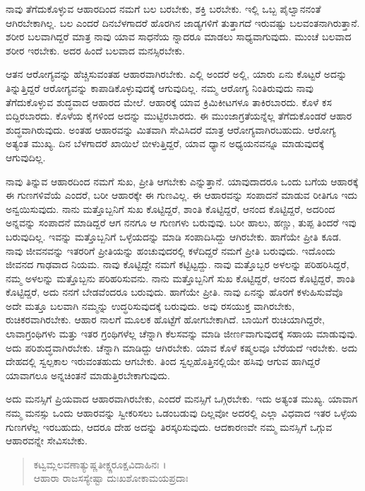 ನಾವು ತೆಗೆದುಕೊಳ್ಳುವ ಆಹಾರದಿಂದ ನಮಗೆ ಬಲ ಬರಬೇಕು, ಶಕ್ತಿ ಬರಬೇಕು. ಇಲ್ಲಿ ಒಬ್ಬ ಪೈಲ್ವಾನನಂತೆ ಆಗಿರಬೇಕಾಗಿಲ್ಲ. ಬಲ ಎಂದರೆ ದಿನಬೆಳಗಾದರೆ ಹೊರಗಿನ ಜಾಡ್ಯಗಳಿಗೆ ತುತ್ತಾಗದೆ ಇರುವಷ್ಟು ಬಲವಂತನಾಗಿರುತ್ತಾನೆ. ಶರೀರ ಬಲವಾಗಿದ್ದರೆ ಮಾತ್ರ ನಾವು ಯಾವ ಸಾಧನೆಯ ನ್ನಾದರೂ ಮಾಡಲು ಸಾಧ್ಯವಾಗುವುದು. ಮುಂಚೆ ಬಲವಾದ ಶರೀರ ಇರಬೇಕು. ಅದರ ಹಿಂದೆ ಬಲವಾದ ಮನಸ್ಸಿರಬೇಕು.

ಆತನ ಆರೋಗ್ಯವನ್ನು ಹೆಚ್ಚಿಸುವಂತಹ ಆಹಾರವಾಗಿರಬೇಕು. ಎಲ್ಲಿ ಅಂದರೆ ಅಲ್ಲಿ, ಯಾರು ಏನು ಕೊಟ್ಟರೆ ಅದನ್ನು ತಿನ್ನುತ್ತಿದ್ದರೆ ಆರೋಗ್ಯವನ್ನು ಕಾಪಾಡಿಕೊಳ್ಳುವುದಕ್ಕೆ ಆಗುವುದಿಲ್ಲ. ನಮ್ಮ ಆರೋಗ್ಯ ನಿಂತಿರುವುದು ನಾವು ತೆಗೆದುಕೊಳ್ಳುವ ಶುದ್ಧವಾದ ಆಹಾರದ ಮೇಲೆ. ಆಹಾರಕ್ಕೆ ಯಾವ ಕ್ರಿಮಿಕೀಟಗಳೂ ತಾಕಿರಬಾರದು. ಕೊಳೆ ಕಸ ಬಿದ್ದಿರಬಾರದು. ಕೊಳೆಯ ಕೈಗಳಿಂದ ಅದನ್ನು ಮುಟ್ಟಿರಬಾರದು. ಈ ಮುಂಜಾಗ್ರತೆಯನ್ನೆಲ್ಲ ತೆಗೆದುಕೊಂಡರೆ ಆಹಾರ ಶುದ್ಧವಾಗಿರುವುದು. ಅಂತಹ ಆಹಾರವನ್ನು ಮಿತವಾಗಿ ಸೇವಿಸಿದರೆ ಮಾತ್ರ ಆರೋಗ್ಯವಾಗಿರಬಹುದು. ಆರೋಗ್ಯ ಅತ್ಯಂತ ಮುಖ್ಯ. ದಿನ ಬೆಳಗಾದರೆ ಖಾಯಿಲೆ ಬೀಳುತ್ತಿದ್ದರೆ, ಯಾವ ಧ್ಯಾನ ಅಧ್ಯಯನವನ್ನೂ ಮಾಡುವುದಕ್ಕೆ ಆಗುವುದಿಲ್ಲ.

ನಾವು ತಿನ್ನುವ ಆಹಾರದಿಂದ ನಮಗೆ ಸುಖ, ಪ್ರೀತಿ ಆಗಬೇಕು ಎನ್ನುತ್ತಾನೆ. ಯಾವುದಾದರೂ ಒಂದು ಬಗೆಯ ಆಹಾರಕ್ಕೆ ಈ ಗುಣಗಳಿವೆಯೆ ಎಂದರೆ, ಬರೀ ಆಹಾರಕ್ಕೇ ಈ ಗುಣವಿಲ್ಲ. ಈ ಆಹಾರವನ್ನು ಸಂಪಾದನೆ ಮಾಡುವ ರೀತಿಗೂ ಇದು ಅನ್ವಯಿಸುವುದು. ನಾನು ಮತ್ತೊಬ್ಬನಿಗೆ ಸುಖ ಕೊಟ್ಟಿದ್ದರೆ, ಶಾಂತಿ ಕೊಟ್ಟಿದ್ದರೆ, ಆನಂದ ಕೊಟ್ಟಿದ್ದರೆ, ಅದರಿಂದ ಅನ್ನವನ್ನು ಸಂಪಾದನೆ ಮಾಡಿದ್ದರೆ ಆಗ ನನಗೂ ಆ ಗುಣಗಳು ಬರುವುವು. ಬರೀ ಹಾಲು, ಹಣ್ಣು, ತುಪ್ಪ ತಿಂದರೆ ಇವು ಬರುವುದಿಲ್ಲ. ಇವನ್ನು ಮತ್ತೊಬ್ಬನಿಗೆ ಒಳ್ಳೆಯದನ್ನು ಮಾಡಿ ಸಂಪಾದಿಸಿದ್ದು ಆಗಿರಬೇಕು. ಹಾಗೆಯೇ ಪ್ರೀತಿ ಕೂಡ. ನಾವು ಜೀವನವನ್ನು ಇತರರಿಗೆ ಪ್ರೀತಿಯನ್ನು ಹಂಚುವುದರಲ್ಲಿ ಕಳೆದಿದ್ದರೆ ನಮಗೆ ಪ್ರೀತಿ ಬರುವುದು. ಇದೊಂದು ಜೀವನದ ಗಾಢವಾದ ನಿಯಮ. ನಾವು ಕೊಟ್ಟಿದ್ದೇ ನಮಗೆ ಕಟ್ಟಿಟ್ಟದ್ದು. ನಾವು ಮತ್ತೊಬ್ಬರ ಅಳಲನ್ನು ಪರಿಹರಿಸಿದ್ದರೆ, ನಮ್ಮ ಅಳಲನ್ನು ಮತ್ತೊಬ್ಬನು ಪರಿಹರಿಸುವನು. ನಾನು ಮತ್ತೊಬ್ಬನಿಗೆ ಸುಖ ಕೊಟ್ಟಿದ್ದರೆ, ಆನಂದ ಕೊಟ್ಟಿದ್ದರೆ, ಶಾಂತಿ ಕೊಟ್ಟಿದ್ದರೆ, ಅದು ನನಗೆ ಬೇಡವೆಂದರೂ ಬರುವುದು. ಹಾಗೆಯೇ ಪ್ರೀತಿ. ನಾವು ಏನನ್ನು ಹೊರಗೆ ಕಳುಹಿಸುವೆವೊ ಅದೇ ಮತ್ತೂ ಬಲವಾಗಿ ನಮ್ಮನ್ನು ಉದ್ಧರಿಸುವುದಕ್ಕೆ ಬರುವುದು. ಅವು ರಸಯುಕ್ತ ವಾಗಿರಬೇಕು, ರುಚಿಕರವಾಗಿರಬೇಕು. ಆಹಾರ ನಾಲಗೆ ಮೂಲಕ ಹೊಟ್ಟೆಗೆ ಹೋಗಬೇಕಾಗಿದೆ. ಬಾಯಿಗೆ ರುಚಿಯಾಗಿದ್ದರೇ, ಲಾವಾಗ್ರಂಥಿಗಳು ಮತ್ತು ಇತರ ಗ್ರಂಥಿಗಳೆಲ್ಲ ಚೆನ್ನಾಗಿ ಕೆಲಸವನ್ನು ಮಾಡಿ ಜೀರ್ಣವಾಗುವುದಕ್ಕೆ ಸಹಾಯ ಮಾಡುವುವು. ಅದು ಪರಿಶುದ್ಧವಾಗಿರಬೇಕು. ಚೆನ್ನಾಗಿ ಮಾಡಿದ್ದು ಆಗಿರಬೇಕು. ಯಾವ ಕೊಳೆ ಕಷ್ಮಲವೂ ಬೆರೆಯದೆ ಇರಬೇಕು. ಅದು ದೇಹದಲ್ಲಿ ಸ್ವಲ್ಪಕಾಲ ಇರುವಂತಹುದು ಆಗಬೇಕು. ತಿಂದ ಸ್ವಲ್ಪಹೊತ್ತಿನಲ್ಲಿಯೇ ಹಸಿವು ಆಗುವ ಹಾಗಿದ್ದರೆ ಯಾವಾಗಲೂ ಅನ್ನಚಿಂತನೆ ಮಾಡುತ್ತಿರಬೇಕಾಗುವುದು.

ಅದು ಮನಸ್ಸಿಗೆ ಪ್ರಿಯವಾದ ಆಹಾರವಾಗಿರಬೇಕು, ಎಂದರೆ ಮನಸ್ಸಿಗೆ ಒಗ್ಗಿರಬೇಕು. ಇದು ಅತ್ಯಂತ ಮುಖ್ಯ. ಯಾವಾಗ ನಮ್ಮ ಮನಸ್ಸು ಒಂದು ಆಹಾರವನ್ನು ಸ್ವೀಕರಿಸಲು ಒಡಂಬಡುವು ದಿಲ್ಲವೋ ಅದರಲ್ಲಿ ಎಲ್ಲಾ ವಿಧವಾದ ಇತರ ಒಳ್ಳೆಯ ಗುಣಗಳೆಲ್ಲ ಇರಬಹುದು, ಆದರೂ ದೇಹ ಅದನ್ನು ತಿರಸ್ಕರಿಸುವುದು. ಆದಕಾರಣವೇ ನಮ್ಮ ಮನಸ್ಸಿಗೆ ಒಗ್ಗುವ ಆಹಾರವನ್ನೇ ಸೇವಿಸಬೇಕು.

\begin{verse}
ಕಟ್ವಮ್ಲಲವಣಾತ್ಯುಷ್ಣತೀಕ್ಷ್ಣರೂಕ್ಷವಿದಾಹಿನಃ ।\\ಆಹಾರಾ ರಾಜಸಸ್ಯೇಷ್ಟಾ ದುಃಖಶೋಕಾಮಯಪ್ರದಾಃ 
\end{verse}

